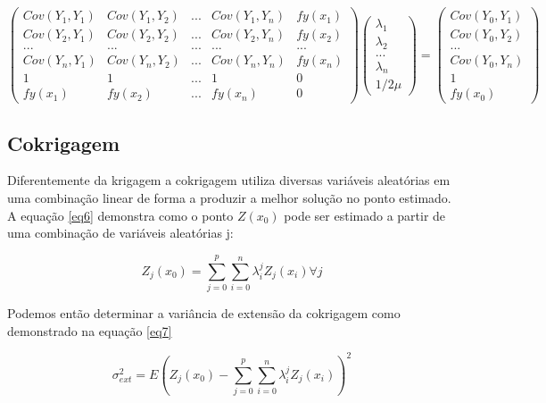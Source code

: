 \begin{equation}\label{eq5}
\begin{pmatrix}
Cov(Y_{1},Y_{1})&Cov(Y_{1},Y_{2})& ... & Cov(Y_{1},Y_{n})& fy(x_1)\\ 
Cov(Y_{2},Y_{1})&Cov(Y_{2},Y_{2})& ... & Cov(Y_{2},Y_{n})& fy(x_2) \\ 
...&...& ...&... & ...\\
Cov(Y_{n},Y_{1})&Cov(Y_{n},Y_{2})& ... & Cov(Y_{n},Y_{n})& fy(x_n)\\
1&1& ...&1& 0\\
fy(x_1)&fy(x_2)& ...&fy(x_n)& 0
\end{pmatrix} 
\begin{pmatrix}
\lambda _{1}\\ 
\lambda _{2}\\ 
...\\ 
\lambda _{n}\\
1/2\mu
\end{pmatrix}=\begin{pmatrix}
Cov(Y_{0}, Y_{1})\\ 
Cov(Y_{0}, Y_{2})\\  
...\\
Cov(Y_{0}, Y_{n})\\
1\\
fy(x_0)
\end{pmatrix}
\end{equation}

 \subsection{Cokrigagem }
 
 Diferentemente da krigagem a cokrigagem utiliza diversas variáveis aleatórias em uma combinação linear de forma a produzir a melhor solução no ponto estimado. A equação \eqref{eq6} demonstra como o ponto $ Z(x_{0})$ pode ser estimado a partir de uma combinação de variáveis aleatórias j:

\begin{equation}\label{eq6}
	Z_{j}(x_{0}) = \sum_{j=0}^{p}\sum_{i=0}^{n}\lambda^{j}_{i} Z_{j}(x_{i})\forall j
\end{equation}

Podemos então determinar a variância de extensão da cokrigagem como demonstrado na equação \eqref{eq7}

\begin{equation}\label{eq7}
\sigma^2_{ext} = E\left( Z_{j} (x_{0}) - \sum_{j=0}^{p}\sum_{i=0}^{n} \lambda^j_{i} Z_j(x_{i})\right)^2
\end{equation}

